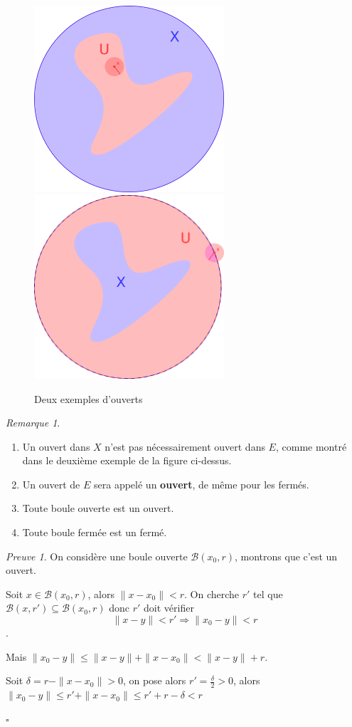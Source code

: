 \documentclass[]{article}
\theoremstyle{remark}
\newtheorem{myrem}{Remarque}
\newtheorem{myproof}{Preuve}
\theoremstyle{definition}
\newcommand{\cqfd}{
	\hfill$\square$
}
\begin{document}
\begin{figure}[h!]
	\centering
	\includegraphics[width=200pt]{Ouverts_fermes}	\includegraphics[width=200pt]{Ouverts_fermes2}
	\caption{Deux exemples d'ouverts}
\end{figure}

\begin{myrem}
	\leavevmode
	\begin{enumerate}
		\item Un ouvert dans $X$ n'est pas nécessairement ouvert dans $E$, comme montré dans le deuxième exemple de la figure ci-dessus.
		\item Un ouvert de $E$ sera appelé un \textbf{ouvert}, de même pour les fermés.
		
		\item Toute boule ouverte est un ouvert.
		
		\item Toute boule fermée est un fermé.
	\end{enumerate}
\end{myrem}

\newpage

\begin{myproof}
	On considère une boule ouverte $\mathcal{B}(x_0, r)$, montrons que c'est un ouvert.
	
	Soit $x \in \mathcal{B}(x_0, r)$, alors $\|x-x_0\| < r$. On cherche $r'$ tel que $\mathcal{B}(x, r') \subseteq \mathcal{B}(x_0, r)$ donc $r'$ doit vérifier $$\|x-y\| < r' \Longrightarrow \|x_0-y\| < r$$.
	
	Mais $\|x_0-y\| \leqslant \|x-y\| + \|x-x_0\| < \|x-y\| + r$.
	
	Soit $\delta = r - \|x-x_0\| > 0$, on pose alors $r'=\frac{\delta}{2} > 0$, alors $\|x_0-y\| \leqslant r' + \|x-x_0\| \leqslant r' + r - \delta < r$

	\cqfd
\end{myproof}
\end{document}
